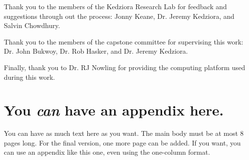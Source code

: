 \documentclass[nohyperref]{article}
\theoremstyle{plain}
\theoremstyle{definition}
\theoremstyle{remark}
\begin{document}
Thank you to the members of the Kedziora Research Lab for feedback and suggestions through out the process: Jonny Keane, Dr. Jeremy Kedziora, and Salvin Chowdhury.

Thank you to the members of the capstone committee for supervising this work: Dr. John Bukwoy, Dr. Rob Hasker, and Dr. Jeremy Kedziora.

Finally, thank you to Dr. RJ Nowling for providing the computing platform used during this work.

\nocite{langley00}





\newpage
\appendix
\onecolumn
\section{You \emph{can} have an appendix here.}

You can have as much text here as you want. The main body must be at most $8$ pages long.
For the final version, one more page can be added.
If you want, you can use an appendix like this one, even using the one-column format.
\end{document}
